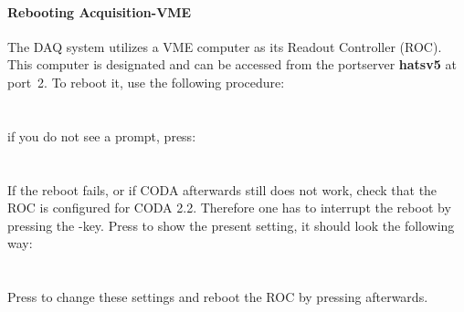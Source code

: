 {{\paragraph{Rebooting Acquisition-VME \\ }

The DAQ system utilizes a VME computer as its Readout Controller (ROC). This
computer is designated  and can be
accessed from the portserver \textbf{hatsv5} at port~2. To reboot it, use the following 
procedure:\\
\\
\\
if you do not see a prompt, press: \\
\\
\mycomp{-$>$ reboot\\
-$>$ Ctrl $]$ \\
telnet$>$ q \\
epmeas@adaqep.jlab.org$>$\\} 
\\
If the reboot fails, or if CODA afterwards still does not work, 
check that the ROC is configured for CODA 2.2.
Therefore one has to interrupt the reboot by pressing the -key.
Press  to show the present setting, it should look the following
way:\\
\\
\\
Press  to change these settings and 
reboot the ROC by pressing  afterwards.

}}
